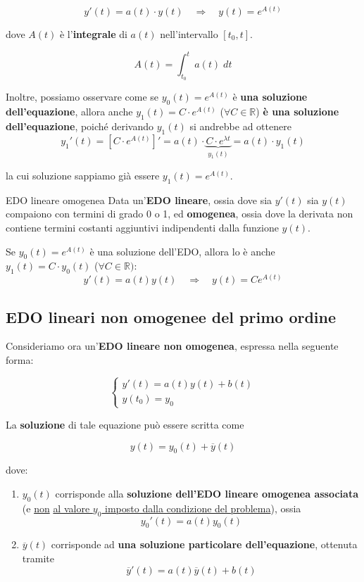 \documentclass[a4paper, 12pt]{report}
\begin{document}
    \[ y'(t) = a(t) \cdot y(t) \quad \Longrightarrow \quad y(t) = e^{A(t)}\]
    
    dove $A(t)$ è l'\textbf{integrale} di $a(t)$ nell'intervallo $[t_0, t]$.
    
    \[ A(t) = \int_{t_0}^{t} a(t) \; dt\]
    
    Inoltre, possiamo osservare come se $y_0(t) = e^{A(t)}$ è \textbf{una soluzione dell'equazione}, allora anche $y_1(t) = C \cdot e^{A(t)}$ ($\forall C \in \mathbb{R}$) \textbf{è una soluzione dell'equazione}, poiché derivando $y_1(t)$ si andrebbe ad ottenere
    \[ y_1'(t) = [C \cdot e^{A(t)}]' = a(t) \cdot \underbrace{C \cdot e^{\lambda t}}_{y_1(t)} = a(t) \cdot y_1(t)\]
    
    la cui soluzione sappiamo già essere $y_1(t) = e^{A(t)}$.
    
    \begin{frameddefn}{EDO lineare omogenea}
        Data un'\textbf{EDO lineare}, ossia dove sia $y'(t)$ sia $y(t)$ compaiono con termini di grado 0 o 1, ed \textbf{omogenea}, ossia dove la derivata non contiene  termini costanti aggiuntivi indipendenti dalla funzione $y(t)$.
        
        Se $y_0(t) = e^{A(t)}$ è una soluzione dell'EDO, allora lo è anche $y_1(t) = C \cdot y_0(t)$ ($\forall C \in \mathbb{R})$:
        \[ y'(t) = a(t) y(t) \quad \Longrightarrow \quad y(t) = C e^{A(t)}\]
        
    \end{frameddefn}
    
    \newpage
    
    \subsection{EDO lineari non omogenee del primo ordine}
    
    Consideriamo ora un'\textbf{EDO lineare non omogenea}, espressa nella seguente forma:
    
    $$
    \left \{ \begin{array}{l}
        y'(t) = a(t) y(t) + b(t)\\
        y(t_0) = y_0
    \end{array}\right .
    $$
    
    La \textbf{soluzione} di tale equazione può essere scritta come
    
    \[ y(t) = y_0(t) + \overline{y}(t)\]
    
    dove:
    
    \begin{enumerate}
        \item $y_0(t)$ corrisponde alla \textbf{soluzione dell'EDO lineare omogenea associata} (e \underline{non} \underline{ al valore $y_0$ imposto dalla condizione del problema}), ossia
        \[ y_0'(t) = a(t)y_0(t)\]
        
        \item $\overline{y}(t)$ corrisponde ad \textbf{una soluzione particolare dell'equazione}, ottenuta tramite
        \[ \overline{y}'(t) = a(t)\overline{y}(t)+b(t)\]
    \end{enumerate}
    
\end{document}

